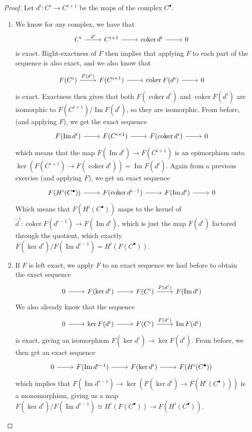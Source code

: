 \documentclass[psamsfonts]{amsart}
\theoremstyle{definition}
\theoremstyle{remark}
\DeclareMathOperator{\im}{Im}
\DeclareMathOperator{\coker}{coker}
\begin{document}
\begin{proof}
Let $d^i : C^i \to C^{i+1}$ be the maps of the complex $C^\bullet$.
\begin{enumerate}
\item We know for any complex, we have that
$$\begin{tikzcd}
C^i \ar[r,"d^i"] & C^{i+1} \ar[r] & \coker d^i \ar[r] & 0
\end{tikzcd}$$
is exact. Right-exactness of $F$ then implies that applying $F$ to each part of the sequence is also exact, and we also know that 
$$\begin{tikzcd}
F(C^i) \ar[r, "F(d^i)"] & F(C^{i+1}) \ar[r] & \coker F(d^i) \ar[r] & 0
\end{tikzcd}$$
is exact. Exactness then gives that both $F(\coker d^i)$ and $\coker F(d^i)$ are isomorphic to $F(C^{i+1}) / \im F(d^i)$, so they are isomorphic. From before, (and applying $F$), we get the exact sequence
$$\begin{tikzcd}
F(\im d^i) \ar[r] & F(C^{i+1}) \ar[r] & F(\coker d^i) \ar[r] & 0
\end{tikzcd}$$
which means that the map $F(\im d^i) \to F(C^{i+1})$ is an epimorphism onto $\ker( F(C^{i+1}) \to F(\coker d^i)) = \im F(d^i)$.
Again from a previous exercise (and applying $F$), we get an exact sequence
$$\begin{tikzcd}
F(H^i(C^\bullet)) \ar[r] & F(\coker d^{i-1}) \ar[r] & F(\im d^i) \ar[r] & 0
\end{tikzcd}$$
Which means that $F(H^i(C^\bullet))$ maps to the kernel of $\tilde{d}^i : \coker F(d^{i-1}) \to F(\im d^i)$, which is just the map $F(d^i)$ factored through the quotient, which exactly $F(\ker d^i) / F(\im d^{i-1}) = H^i(F(C^\bullet))$.
\item If $F$ is left exact, we apply $F$ to an exact sequence we had before to obtain the exact sequence
$$\begin{tikzcd}
0 \ar[r] & F(\ker d^i) \ar[r] & F( C^i) \ar[r, "F(d^i)"] & F(\im d^i)
\end{tikzcd}$$
We also already know that the sequence
$$\begin{tikzcd}
0 \ar[r] & \ker F(d^i) \ar[r] & F(C^i) \ar[r, "F(d^i)"] & \im F(d^i)
\end{tikzcd}$$
is exact, giving an isomorphism $F(\ker d^i) \to \ker F(d^i)$. From before, we then get an exact sequence
$$\begin{tikzcd}
0 \ar[r] & F(\im d^{i-1}) \ar[r] & F(\ker d^i) \ar[r] & F(H^i(C^\bullet))
\end{tikzcd}$$
which implies that $F(\im d^{i-1}) \to \ker( F(\ker d^i) \to F(H^i(C^\bullet)))$ is a monomorphism, giving us a map $F(\ker d^i) / F(\im d^{i-1}) \cong H^i(F(C^\bullet)) \to F(H^i(C^\bullet))$.

\end{enumerate}
\end{proof}
\end{document}
